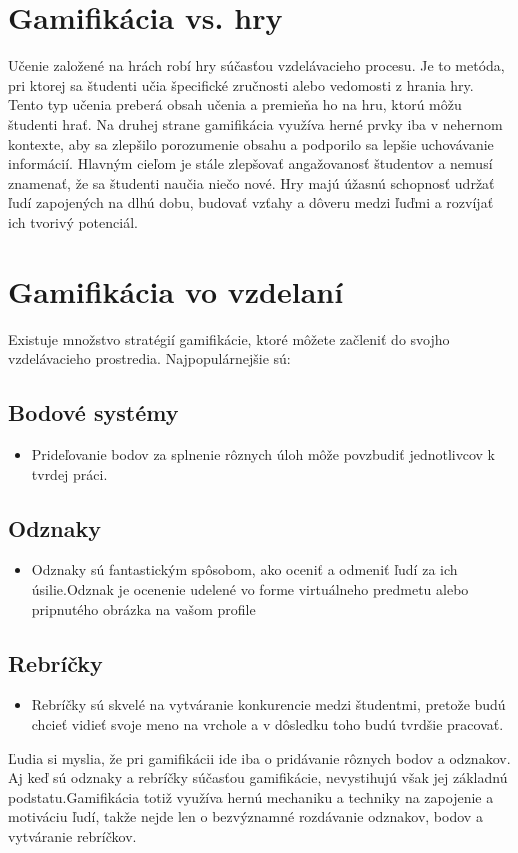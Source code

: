 \documentclass[10pt,twoside,slovak,a4paper]{article}
\begin{document}
\section{Gamifikácia vs. hry} 
Učenie založené na hrách robí hry súčasťou vzdelávacieho procesu.
Je to metóda, pri ktorej sa študenti učia špecifické zručnosti alebo vedomosti z hrania hry.
Tento typ učenia preberá obsah učenia a premieňa ho na hru, ktorú môžu študenti hrať.
Na druhej strane gamifikácia využíva herné prvky iba v nehernom kontexte, aby sa zlepšilo porozumenie obsahu a podporilo sa lepšie uchovávanie informácií.
Hlavným cieľom je stále zlepšovať angažovanosť študentov a nemusí znamenať, že sa študenti naučia niečo nové. Hry majú úžasnú schopnosť udržať ľudí zapojených na dlhú dobu, budovať vzťahy a dôveru medzi ľuďmi a rozvíjať ich tvorivý potenciál.


\section{Gamifikácia vo vzdelaní} 

Existuje množstvo stratégií gamifikácie, ktoré môžete začleniť do svojho vzdelávacieho prostredia.
Najpopulárnejšie sú\cite{buljan}: 
\subsection{Bodové systémy}
    \begin{itemize}
    \item Prideľovanie bodov za splnenie rôznych úloh môže povzbudiť    jednotlivcov k tvrdej práci.
    \end{itemize}

\subsection{Odznaky}
    
    \begin{itemize}
    \item  Odznaky sú fantastickým spôsobom, ako oceniť a odmeniť ľudí za ich úsilie.Odznak je ocenenie udelené vo forme virtuálneho predmetu alebo pripnutého obrázka na vašom profile
    \end{itemize}
 
\subsection{Rebríčky} 

    \begin{itemize}
    \item Rebríčky sú skvelé na vytváranie konkurencie medzi študentmi, pretože budú chcieť vidieť svoje meno na vrchole a v dôsledku toho budú tvrdšie pracovať.
    \end{itemize}
Ľudia si myslia, že pri gamifikácii ide iba o pridávanie rôznych bodov a odznakov.
Aj keď sú odznaky a rebríčky súčasťou gamifikácie, nevystihujú však jej základnú podstatu.\cite{chou}Gamifikácia totiž využíva hernú mechaniku a techniky na zapojenie a motiváciu ľudí, takže nejde len o bezvýznamné rozdávanie odznakov, bodov a vytváranie rebríčkov.
\end{document}
